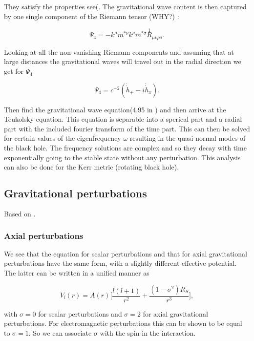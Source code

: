 \documentclass[12 pt]{article}
\begin{document}
	They satisfy the properties see(\cite{creighton}. The gravitational wave content is then captured by one single component of the Riemann tensor (WHY?) :
	
	\begin{equation}
		\Psi_4 = -k^{\mu} m^{*\nu} k^{\rho} m^{*\sigma} \stackrel{1}{R}_{\mu \nu \rho \sigma}.
	\end{equation}
	
	Looking at all the non-vanishing Riemann components and assuming that at large distances the gravitational waves will travel out in the radial direction we get for $ \Psi_4$
	
	\begin{equation}
		\Psi_4 = c^{-2} ( \Dot{\Dot{h}}_{+} - i\Dot{\Dot{h}}_{x}) .
	\end{equation}
	
	Then find the gravitational wave equation(4.95 in \cite{creighton}) and then arrive at the Teukolsky equation. This equation is separable into a sperical part and a radial part with the included fourier transform of the time part. This can then be solved for certain values of the eigenfrequency $\omega$ resulting in the quasi normal modes of the black hole. The frequency solutions are complex and so they decay with time exponentially going to the stable state without any perturbation. This analysis can also be done for the Kerr metric (rotating black hole). 
	
	\subsection{Gravitational perturbations}
	Based on \cite{maggiore}.
	
	\subsubsection{Axial perturbations}
	We see that the equation for scalar perturbations and that for axial
	gravitational perturbations have the same form, with a slightly different
	effective potential. The latter can be written in a unified manner as
	
	\begin{equation}
		V_l(r) = A(r) \big[\frac{l(l+1)}{r^2} + \frac{(1-\sigma^2)R_S}{r^3} \big],
	\end{equation}
	
	with $\sigma = 0$ for scalar perturbations and $\sigma = 2 $ for axial gravitational perturbations. For electromagnetic perturbations this can be shown to be equal to $\sigma = 1$. So we can associate $\sigma$ with the spin in the interaction. 
	
\end{document}
